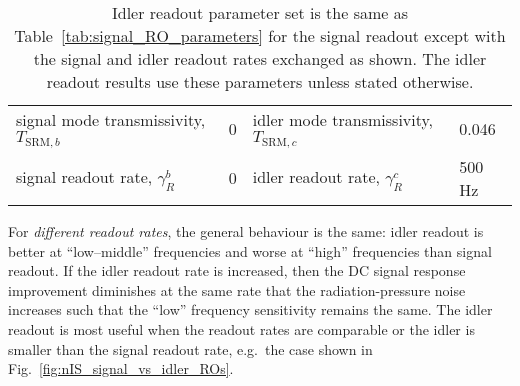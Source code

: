 \begin{table}[h]
\centering
\begin{tabular}{@{}ll|ll@{}}
\toprule
signal mode transmissivity, $T_{\text{SRM},b}$ & 0 & idler mode transmissivity, $T_{\text{SRM},c}$ & 0.046 \\ 
signal readout rate, $\gamma^b_R$ & 0 & idler readout rate, $\gamma^c_R$ & 500 Hz \\ \bottomrule
\end{tabular}
\caption{Idler readout parameter set is the same as Table~\ref{tab:signal_RO_parameters} for the signal readout except with the signal and idler readout rates exchanged as shown. The idler readout results use these parameters unless stated otherwise.}
\label{tab:idler_RO_parameters}
\end{table}

For \emph{different readout rates}, the general behaviour is the same: idler readout is better at ``low--middle'' frequencies and worse at ``high'' frequencies than signal readout. If the idler readout rate is increased, then the DC signal response improvement diminishes at the same rate that the radiation-pressure noise increases such that the ``low'' frequency sensitivity remains the same. The idler readout is most useful when the readout rates are comparable or the idler is smaller than the signal readout rate, e.g.\ the case shown in Fig.~\ref{fig:nIS_signal_vs_idler_ROs}.

